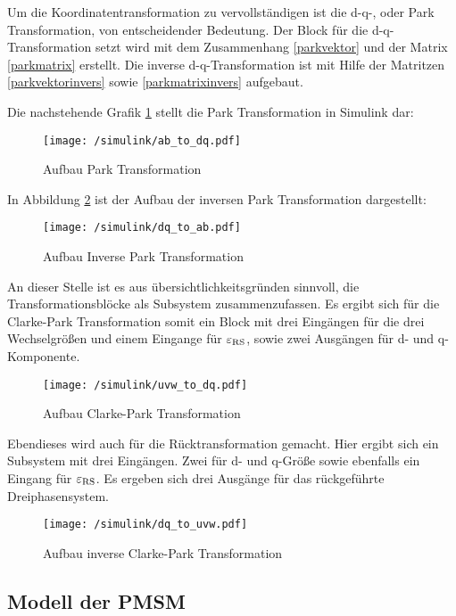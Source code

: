 Um die Koordinatentransformation zu vervollständigen ist die d-q-, oder Park Transformation, von entscheidender Bedeutung.
Der Block für die d-q-Transformation setzt wird mit dem Zusammenhang \ref{parkvektor} und der Matrix \ref{parkmatrix} erstellt. 
Die inverse d-q-Transformation ist mit Hilfe der Matritzen \ref{parkvektorinvers} sowie \ref{parkmatrixinvers} aufgebaut.

Die nachstehende Grafik \ref{fig:ab_to_dq} stellt die Park Transformation in Simulink dar:

\begin{figure}[h]
	\centering
	\texttt{[image: /simulink/ab\_to\_dq.pdf]}
	\label{fig:ab_to_dq}
	\caption{Aufbau Park Transformation}
\end{figure}

In Abbildung \ref{fig:dq_to_ab} ist der Aufbau der inversen Park Transformation dargestellt:

\begin{figure}[h]
	\centering
	\texttt{[image: /simulink/dq\_to\_ab.pdf]}
	\label{fig:dq_to_ab}
	\caption{Aufbau Inverse Park Transformation}
\end{figure}

An dieser Stelle ist es aus übersichtlichkeitsgründen sinnvoll, die Transformationsblöcke als Subsystem zusammenzufassen.
Es ergibt sich für die Clarke-Park Transformation somit ein Block mit drei Eingängen für die drei Wechselgrößen und einem Eingange für $\varepsilon_{\mathrm{RS}}$, sowie zwei Ausgängen für d- und q-Komponente.

\begin{figure}[h]
	\centering
	\texttt{[image: /simulink/uvw\_to\_dq.pdf]}
	\label{fig:uvw_to_dq}
	\caption{Aufbau Clarke-Park Transformation}
\end{figure}

Ebendieses wird auch für die Rücktransformation gemacht. 
Hier ergibt sich ein Subsystem mit drei Eingängen. 
Zwei für d- und q-Größe sowie ebenfalls ein Eingang für $\varepsilon_{\mathrm{RS}}$.
Es ergeben sich drei Ausgänge für das rückgeführte Dreiphasensystem.

\begin{figure}[h]
	\centering
	\texttt{[image: /simulink/dq\_to\_uvw.pdf]}
	\label{fig:dq_to_uvw}
	\caption{Aufbau inverse Clarke-Park Transformation}
\end{figure}


\subsection{Modell der PMSM}

